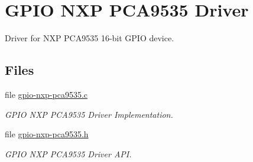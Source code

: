 \hypertarget{group__I2CGPIONXPPCA9535}{}\section{G\+P\+IO N\+XP P\+C\+A9535 Driver}
\label{group__I2CGPIONXPPCA9535}


Driver for N\+XP P\+C\+A9535 16-\/bit G\+P\+IO device.  


\subsection*{Files}
\begin{DoxyCompactItemize}
\item 
file \mbox{\hyperlink{gpio-nxp-pca9535_8c}{gpio-\/nxp-\/pca9535.\+c}}
\begin{DoxyCompactList}\small\item\em G\+P\+IO N\+XP P\+C\+A9535 Driver Implementation. \end{DoxyCompactList}\item 
file \mbox{\hyperlink{gpio-nxp-pca9535_8h}{gpio-\/nxp-\/pca9535.\+h}}
\begin{DoxyCompactList}\small\item\em G\+P\+IO N\+XP P\+C\+A9535 Driver A\+PI. \end{DoxyCompactList}\end{DoxyCompactItemize}
